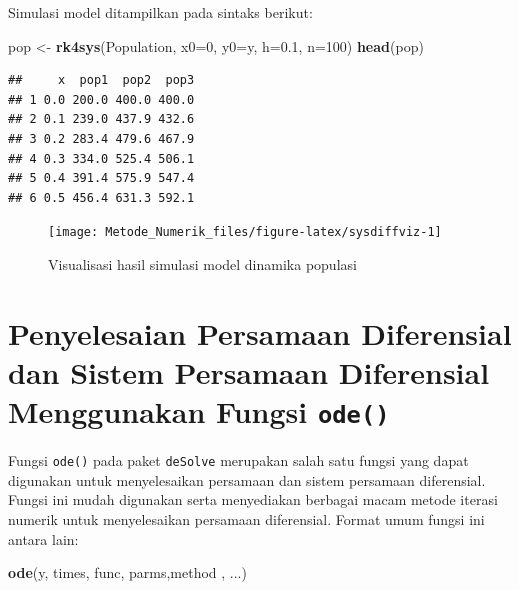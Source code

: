 \documentclass[
]{book}
\newenvironment{Shaded}{\begin{snugshade}}{\end{snugshade}}
\newcommand{\AttributeTok}[1]{\textcolor[rgb]{0.13,0.29,0.53}{#1}}
\newcommand{\DecValTok}[1]{\textcolor[rgb]{0.00,0.00,0.81}{#1}}
\newcommand{\FloatTok}[1]{\textcolor[rgb]{0.00,0.00,0.81}{#1}}
\newcommand{\FunctionTok}[1]{\textcolor[rgb]{0.13,0.29,0.53}{\textbf{#1}}}
\newcommand{\NormalTok}[1]{#1}
\newcommand{\OtherTok}[1]{\textcolor[rgb]{0.56,0.35,0.01}{#1}}
\theoremstyle{definition}
\theoremstyle{definition}
\theoremstyle{definition}
\theoremstyle{definition}
\theoremstyle{remark}
\begin{document}
Simulasi model ditampilkan pada sintaks berikut:

\begin{Shaded}
\begin{Highlighting}[]
\NormalTok{pop }\OtherTok{\textless{}{-}} \FunctionTok{rk4sys}\NormalTok{(Population, }\AttributeTok{x0=}\DecValTok{0}\NormalTok{, }\AttributeTok{y0=}\NormalTok{y, }\AttributeTok{h=}\FloatTok{0.1}\NormalTok{, }\AttributeTok{n=}\DecValTok{100}\NormalTok{)}
\FunctionTok{head}\NormalTok{(pop)}
\end{Highlighting}
\end{Shaded}

\begin{verbatim}
##     x  pop1  pop2  pop3
## 1 0.0 200.0 400.0 400.0
## 2 0.1 239.0 437.9 432.6
## 3 0.2 283.4 479.6 467.9
## 4 0.3 334.0 525.4 506.1
## 5 0.4 391.4 575.9 547.4
## 6 0.5 456.4 631.3 592.1
\end{verbatim}

\begin{figure}

{\centering \texttt{[image: Metode\_Numerik\_files/figure-latex/sysdiffviz-1]} 

}

\caption{Visualisasi hasil simulasi model dinamika populasi}\label{fig:sysdiffviz}
\end{figure}

\hypertarget{penyelesaian-persamaan-diferensial-dan-sistem-persamaan-diferensial-menggunakan-fungsi-ode}{%
\section{\texorpdfstring{Penyelesaian Persamaan Diferensial dan Sistem Persamaan Diferensial Menggunakan Fungsi \texttt{ode()}}{Penyelesaian Persamaan Diferensial dan Sistem Persamaan Diferensial Menggunakan Fungsi ode()}}\label{penyelesaian-persamaan-diferensial-dan-sistem-persamaan-diferensial-menggunakan-fungsi-ode}}

Fungsi \texttt{ode()} pada paket \texttt{deSolve} merupakan salah satu fungsi yang dapat digunakan untuk menyelesaikan persamaan dan sistem persamaan diferensial. Fungsi ini mudah digunakan serta menyediakan berbagai macam metode iterasi numerik untuk menyelesaikan persamaan diferensial. Format umum fungsi ini antara lain:

\begin{Shaded}
\begin{Highlighting}[]
\FunctionTok{ode}\NormalTok{(y, times, func, parms,method , ...)}
\end{Highlighting}
\end{Shaded}
\end{document}
